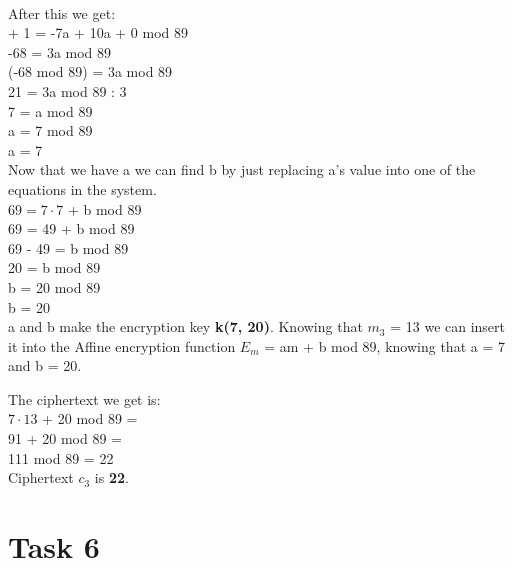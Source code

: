 \documentclass[12pt]{article}
\begin{document}
\noindent \\After this we get: \\

 + 1 = -7a + 10a + 0 mod 89 \\
-68 = 3a mod 89 \\
(-68 mod 89) = 3a mod 89 \\
21 = 3a mod 89 \textbar{} : 3\\
7 = a mod 89 \\
a = 7 mod 89 \\
a = 7 \\

\noindent Now that we have a we can find b by just replacing a's value into one of the equations in the system. \\

\noindent $69 = 7 \cdot 7$ + b mod 89 \\
69 = 49 + b mod 89 \\
69 - 49 = b mod 89 \\
20 = b mod 89 \\
b = 20 mod 89 \\
b = 20 \\

\noindent a and b make the encryption key \textbf{k(7, 20)}.
Knowing that $m_3$ = 13 we can insert it into the Affine encryption function
$E_m$ = am + b mod 89, knowing that a = 7 and b = 20. \\
\pagebreak

\noindent The ciphertext we get is: \\

\noindent $7 \cdot 13$ + 20 mod 89 = \\
91 + 20 mod 89 = \\
111 mod 89 = 22 \\

\noindent Ciphertext $c_3$ is \textbf{22}.

\section*{Task 6}
\end{document}
